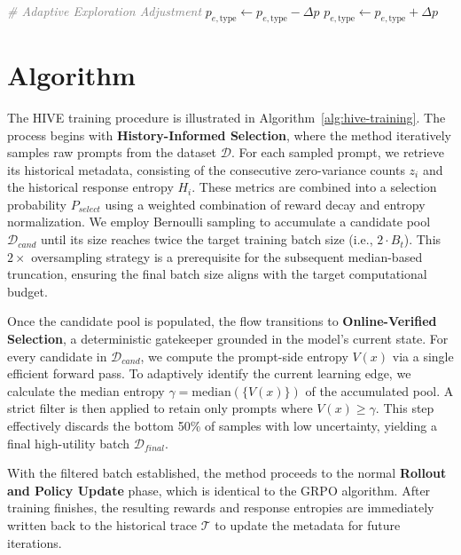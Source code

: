 \begin{algorithm}[t]
\begin{algorithmic}[1]
    \STATE \textcolor{gray}{\textit{\# Adaptive Exploration Adjustment}}
            \STATE $p_{e,\text{type}} \gets p_{e,\text{type}} - \Delta p$
        \ELSE
            \STATE $p_{e,\text{type}} \gets p_{e,\text{type}} + \Delta p$
        \ENDIF
    \ENDFOR


\end{algorithmic}
\end{algorithm}

\section{{Algorithm}}
\label{appendix-sec:alg}

The HIVE training procedure is illustrated in Algorithm~\ref{alg:hive-training}. 
The process begins with \textbf{History-Informed Selection}, where the method iteratively samples raw prompts from the dataset $\mathcal{D}$. 
For each sampled prompt, we retrieve its historical metadata, consisting of the consecutive zero-variance counts $z_i$ and the historical response entropy $H_i$. These metrics are combined into a selection probability $P_{select}$ using a weighted combination of reward decay and entropy normalization. We employ Bernoulli sampling to accumulate a candidate pool $\mathcal{D}_{cand}$ until its size reaches twice the target training batch size (i.e., $2 \cdot B_t$). This $2\times$ oversampling strategy is a prerequisite for the subsequent median-based truncation, ensuring the final batch size aligns with the target computational budget.

Once the candidate pool is populated, the flow transitions to \textbf{Online-Verified Selection}, a deterministic gatekeeper grounded in the model's current state. For every candidate in $\mathcal{D}_{cand}$, we compute the prompt-side entropy $V(x)$ via a single efficient forward pass. To adaptively identify the current learning edge, we calculate the median entropy $\gamma = \text{median}(\{V(x)\})$ of the accumulated pool. A strict filter is then applied to retain only prompts where $V(x) \geq \gamma$. This step effectively discards the bottom 50\% of samples with low uncertainty, yielding a final high-utility batch $\mathcal{D}_{final}$.

With the filtered batch established, the method proceeds to the normal \textbf{Rollout and Policy Update} phase, which is identical to the GRPO algorithm.
After training finishes, the resulting rewards and response entropies are immediately written back to the historical trace $\mathcal{T}$ to update the metadata for future iterations.

